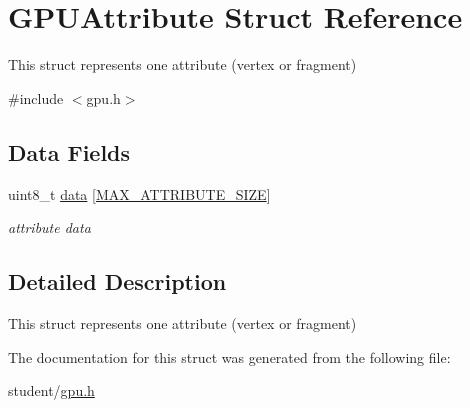 \hypertarget{structGPUAttribute}{}\section{G\+P\+U\+Attribute Struct Reference}
\label{structGPUAttribute}


This struct represents one attribute (vertex or fragment)  




{\ttfamily \#include $<$gpu.\+h$>$}

\subsection*{Data Fields}
\begin{DoxyCompactItemize}
\item 
\mbox{\label{structGPUAttribute_a1c13d3d1a40e3007528fa0a01d5b64f6}} 
uint8\+\_\+t \hyperlink{structGPUAttribute_a1c13d3d1a40e3007528fa0a01d5b64f6}{data} \mbox{[}\hyperlink{gpu_8h_a1edf85281de595fe1bc2b690074c1d21}{M\+A\+X\+\_\+\+A\+T\+T\+R\+I\+B\+U\+T\+E\+\_\+\+S\+I\+ZE}\mbox{]}
\begin{DoxyCompactList}\small\item\em attribute data \end{DoxyCompactList}\end{DoxyCompactItemize}


\subsection{Detailed Description}
This struct represents one attribute (vertex or fragment) 

The documentation for this struct was generated from the following file\+:\begin{DoxyCompactItemize}
\item 
student/\hyperlink{gpu_8h}{gpu.\+h}\end{DoxyCompactItemize}
